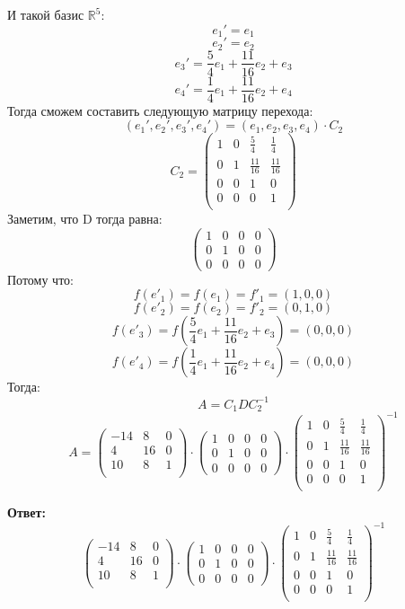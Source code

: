 \documentclass[a4paper,12pt]{article}
\begin{document}
И такой базис $\mathbb{R}^5$:
\[
e_1' = e_1
\]
\[
e_2' = e_2
\]
\[
e_3' = \frac{5}{4}e_1 + \frac{11}{16}e_2 + e_3
\]
\[
e_4'  = \frac{1}{4} e_1 + \frac{11}{16}e_2 + e_4
\]
Тогда сможем составить следующую матрицу перехода:
\[
(e_1', e_2', e_3', e_4') = (e_1, e_2, e_3, e_4) \cdot C_2
\]
\[
C_2 = \begin{pmatrix}
1 & 0 & \frac{5}{4} & \frac{1}{4} \\
0 & 1 & \frac{11}{16} & \frac{11}{16} \\
0 & 0 & 1 & 0 \\
0 & 0 & 0 & 1\\
\end{pmatrix}
\]
Заметим, что D тогда равна:
\[
\left(\begin{matrix}
1 & 0 & 0 & 0 \\
0 & 1 & 0 & 0 \\
0 & 0 & 0 & 0
\end{matrix}\right)
\]
Потому что:
\[
f(e'_1)  = f(e_1) = f'_1 = (1, 0, 0)
\]
\[
f(e'_2)  = f(e_2) = f'_2 = (0, 1, 0)
\]
\[
f(e'_3) = f\left(\frac{5}{4}e_1 + \frac{11}{16}e_2 + e_3\right) = (0, 0, 0)
\]
\[
f(e'_4) = f\left(\frac{1}{4} e_1 + \frac{11}{16} e_2 + e_4 \right)= (0, 0, 0)
\]
Тогда:
\[
A = C_1 D C_2^{-1}
\]
\[
A  = \begin{pmatrix}
-14 & 8 & 0 \\4 & 16 & 0 \\ 10 & 8 & 1\\
\end{pmatrix} \cdot \left(\begin{matrix}
1 & 0 & 0 & 0 \\
0 & 1 & 0 & 0 \\
0 & 0 & 0 & 0
\end{matrix}\right)
\cdot \begin{pmatrix}
1 & 0 & \frac{5}{4} & \frac{1}{4} \\
0 & 1 & \frac{11}{16} & \frac{11}{16} \\
0 & 0 & 1 & 0 \\
0 & 0 & 0 & 1\\
\end{pmatrix}^{-1}
\]
{\Large \begin{center}
\textbf{Ответ: } 
\[
\begin{pmatrix}
-14 & 8 & 0 \\4 & 16 & 0 \\ 10 & 8 & 1\\
\end{pmatrix} \cdot \left(\begin{matrix}
1 & 0 & 0 & 0 \\
0 & 1 & 0 & 0 \\
0 & 0 & 0 & 0
\end{matrix}\right)
\cdot \begin{pmatrix}
1 & 0 & \frac{5}{4} & \frac{1}{4} \\
0 & 1 & \frac{11}{16} & \frac{11}{16} \\
0 & 0 & 1 & 0 \\
0 & 0 & 0 & 1\\
\end{pmatrix}^{-1}
\]
\end{center}}
\clearpage
\end{document}

